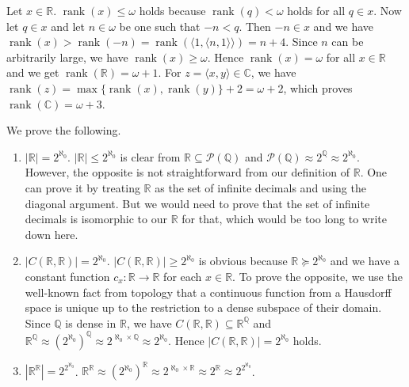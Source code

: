 \documentclass[12pt]{article}
\newcommand{\rank}{\mathop{\mathrm{rank}}}
\theoremstyle{definition}
\newenvironment{customthm}[1]
  {\renewcommand\theinnercustomthm{#1}\innercustomthm}
  {\endinnercustomthm}
\begin{document}
\begin{customthm}{I.15.5} Let $x\in\mathbb{R}$. $\rank(x)\leq\omega$ holds because $\rank(q)<\omega$ holds for all $q\in x$. Now let $q\in x$ and let $n\in\omega$ be one such that $-n<q$. Then $-n\in x$ and we have $\rank(x)>\rank(-n)=\rank(\langle 1,\langle n,1\rangle\rangle)=n+4$. Since $n$ can be arbitrarily large, we have $\rank(x)\geq\omega$. Hence $\rank(x)=\omega$ for all $x\in\mathbb{R}$ and we get $\rank(\mathbb{R})=\omega+1$. For $z=\langle x,y\rangle\in\mathbb{C}$, we have $\rank(z)=\max\{\rank(x),\rank(y)\}+2=\omega+2$, which proves $\rank(\mathbb{C})=\omega+3$.
\end{customthm}

\begin{customthm}{I.15.8} We prove the following.
\begin{enumerate}
\item\underline{$|\mathbb{R}|=2^{\aleph_0}$}. $|\mathbb{R}|\leq2^{\aleph_0}$ is clear from $\mathbb{R}\subseteq{\mathcal{P}(\mathbb{Q})}$ and $\mathcal{P}(\mathbb{Q})\approx2^\mathbb{Q}\approx2^{\aleph_0}$. However, the opposite is not straightforward from our definition of $\mathbb{R}$. One can prove it by treating $\mathbb{R}$ as the set of infinite decimals and using the diagonal argument. But we would need to prove that the set of infinite decimals is isomorphic to our $\mathbb{R}$ for that, which would be too long to write down here.
\item\underline{$|C(\mathbb{R},\mathbb{R})|=2^{\aleph_0}$}. $|C(\mathbb{R},\mathbb{R})|\geq2^{\aleph_0}$ is obvious because $\mathbb{R}\succcurlyeq2^{\aleph_0}$ and we have a constant function $c_x:\mathbb{R}\rightarrow\mathbb{R}$ for each $x\in\mathbb{R}$. To prove the opposite, we use the well-known fact from topology that a continuous function from a Hausdorff space is unique up to the restriction to a dense subspace of their domain. Since $\mathbb{Q}$ is dense in $\mathbb{R}$, we have $C(\mathbb{R},\mathbb{R})\subseteq\mathbb{R}^\mathbb{Q}$ and $\mathbb{R}^\mathbb{Q}\approx(2^{\aleph_0})^\mathbb{Q}\approx2^{\aleph_0\times\mathbb{Q}}\approx2^{\aleph_0}$. Hence $|C(\mathbb{R},\mathbb{R})|=2^{\aleph_0}$ holds.
\item\underline{$|\mathbb{R}^\mathbb{R}|=2^{2^{\aleph_0}}$}. $\mathbb{R}^\mathbb{R}\approx (2^{\aleph_0})^\mathbb{R}\approx 2^{\aleph_0\times\mathbb{R}}\approx2^\mathbb{R}\approx2^{2^{\aleph_0}}$.
\end{enumerate}
\end{customthm}
\end{document}
